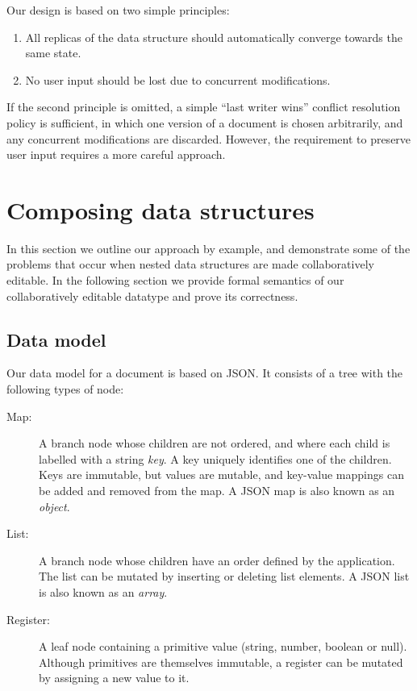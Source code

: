 \documentclass[10pt,journal,compsoc]{IEEEtran}
\begin{document}
Our design is based on two simple principles:
\begin{enumerate}
\item All replicas of the data structure should automatically converge towards the same state.
\item No user input should be lost due to concurrent modifications.
\end{enumerate}

If the second principle is omitted, a simple ``last writer wins'' conflict resolution policy is sufficient, in which one version of a document is chosen arbitrarily, and any concurrent modifications are discarded. However, the requirement to preserve user input requires a more careful approach.

\section{Composing data structures}

In this section we outline our approach by example, and demonstrate some of the problems that occur when nested data structures are made collaboratively editable. In the following section we provide formal semantics of our collaboratively editable datatype and prove its correctness.

\subsection{Data model}

Our data model for a document is based on JSON. It consists of a tree with the following types of node:

\begin{description}
\item[Map:] A branch node whose children are not ordered, and where each child is labelled with a string \emph{key}. A key uniquely identifies one of the children. Keys are immutable, but values are mutable, and key-value mappings can be added and removed from the map. A JSON map is also known as an \emph{object}.
\item[List:] A branch node whose children have an order defined by the application. The list can be mutated by inserting or deleting list elements. A JSON list is also known as an \emph{array}.
\item[Register:] A leaf node containing a primitive value (string, number, boolean or null). Although primitives are themselves immutable, a register can be mutated by assigning a new value to it.
\end{description}
\end{document}
